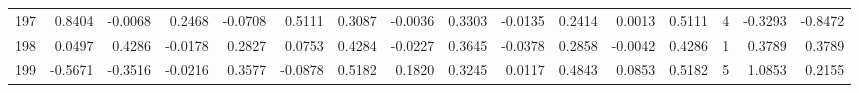 \begin{tabular}{lrrrrrrrrrrrrrrr}
197 &      0.8404 & -0.0068 &  0.2468 & -0.0708 &  0.5111 &  0.3087 & -0.0036 &  0.3303 & -0.0135 &  0.2414 &   0.0013 &     0.5111 &      4 &                   -0.3293 &                    -0.8472 \\
198 &      0.0497 &  0.4286 & -0.0178 &  0.2827 &  0.0753 &  0.4284 & -0.0227 &  0.3645 & -0.0378 &  0.2858 &  -0.0042 &     0.4286 &      1 &                    0.3789 &                     0.3789 \\
199 &     -0.5671 & -0.3516 & -0.0216 &  0.3577 & -0.0878 &  0.5182 &  0.1820 &  0.3245 &  0.0117 &  0.4843 &   0.0853 &     0.5182 &      5 &                    1.0853 &                     0.2155 \\
\bottomrule
\end{tabular}
